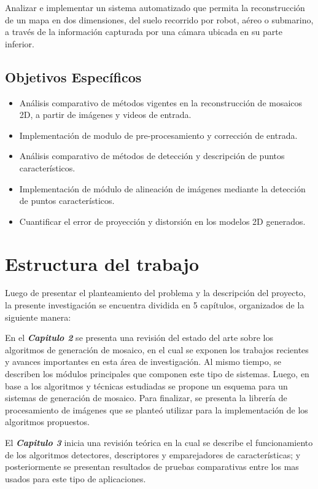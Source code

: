 Analizar e implementar un sistema automatizado que permita la reconstrucción de un mapa en dos dimensiones, del suelo recorrido por robot, aéreo o submarino, a través de la información capturada por una cámara ubicada en su parte inferior.

\subsection{Objetivos Específicos}

\begin{itemize}
	\item Análisis comparativo de métodos vigentes en la reconstrucción de mosaicos 2D, a partir de imágenes y videos de entrada.
	\item Implementación de modulo de pre-procesamiento y corrección de entrada.
	\item Análisis comparativo de métodos de detección y descripción de puntos característicos.
	\item Implementación de módulo de alineación de imágenes mediante la detección de puntos característicos.
	\item Cuantificar el error de proyección y distorsión en los modelos 2D generados.
\end{itemize}

\section{Estructura del trabajo}

Luego de presentar el planteamiento del problema y la descripción del proyecto, la presente investigación se encuentra dividida en 5 capítulos, organizados de la siguiente manera:

En el \textit{\textbf{Capitulo 2}} se presenta una revisión del estado del arte sobre los algoritmos de generación de mosaico, en el cual se exponen los trabajos recientes y avances importantes en esta área de investigación. Al mismo tiempo, se describen los módulos principales que componen este tipo de sistemas. Luego, en base a los algoritmos y técnicas estudiadas se propone un esquema para un sistemas de generación de mosaico. Para finalizar, se presenta la librería de procesamiento de imágenes que se planteó utilizar para la implementación de los algoritmos propuestos.

El \textit{\textbf{Capitulo 3}} inicia una revisión teórica en la cual se describe el funcionamiento de los algoritmos detectores, descriptores y emparejadores de características; y posteriormente se presentan resultados de pruebas comparativas entre los mas usados para este tipo de aplicaciones. 

